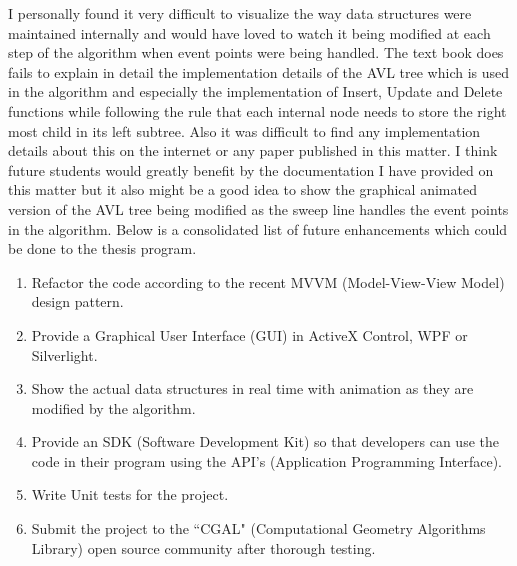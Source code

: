 I personally found it very difficult to visualize the way data structures were maintained internally and would have loved to watch it being modified at each step of the algorithm when event points were being handled. The text book \cite{TEXTBOOK1} does fails to explain in detail the implementation details of the AVL tree which is used in the algorithm and especially the implementation of Insert, Update and Delete functions while following the rule that each internal node needs to store the right most child in its left subtree. Also it was difficult to find any implementation details about this on the internet or any paper published in this matter. I think future students would greatly benefit by the documentation I have provided on this matter but it also might be a good idea to show the graphical animated version of the AVL tree being modified as the sweep line handles the event points in the algorithm. Below is a consolidated list of future enhancements which could be done to the thesis program.
\begin{enumerate}
\item Refactor the code according to the recent MVVM (Model-View-View Model) design pattern.
\item Provide a Graphical User Interface (GUI) in ActiveX Control, WPF or Silverlight.
\item Show the actual data structures in real time with animation as they are modified by the algorithm.
\item Provide an SDK (Software Development Kit) so that developers can use the code in their program using the API's (Application Programming Interface). 
\item Write Unit tests for the project.
\item Submit the project to the ``CGAL" (Computational Geometry Algorithms Library) open source community \cite{CGAL} after thorough testing.
\end{enumerate}